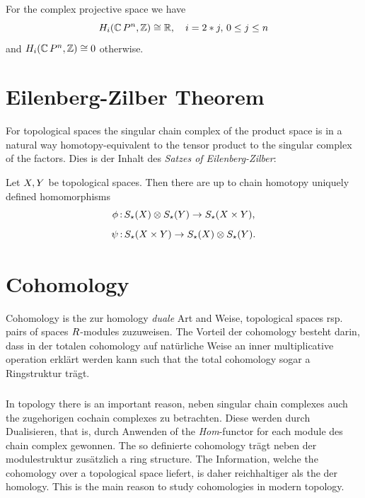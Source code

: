 \documentclass[11pt,twoside]{article}
\begin{document}
\subparagraph{}
For the complex projective space we have
\[
H_i({\mathbb{C}}\,P^n,{\mathbb{Z}}) \cong {\mathbb{R}}, \quad i=2*j, \, 0 \leq j \leq n
\]
and $H_i({\mathbb{C}}\,P^n,{\mathbb{Z}}) \cong 0$ otherwise.

\section{Eilenberg-Zilber Theorem}
For topological spaces the singular chain complex of the product space
is in a natural way homotopy-equivalent to the tensor product to the singular
complex of the factors.
Dies is der Inhalt des \textit{Satzes of Eilenberg-Zilber}:

\begin{theorem1}
Let $X,Y$ be topological spaces.
Then there are up to chain homotopy uniquely defined homomorphisms
\[
\phi{\,:\,} S_{\star}(X) \otimes S_{\star}(Y) \to S_{\star} (X \times Y),
\]
\[
\psi{\,:\,} S_{\star}(X \times Y) \to S_{\star}(X) \otimes S_{\star}(Y).
\]
\end{theorem1}

\section{Cohomology}
Cohomology is the zur homology \textit{duale} Art and Weise,
topological spaces rsp. pairs of spaces $R$-modules zuzuweisen.
The Vorteil der cohomology besteht darin,
dass in der totalen cohomology auf nat\"urliche Weise an inner
multiplicative operation erkl\"art werden kann
such that
the total cohomology sogar a Ringstruktur tr\"agt.

\subparagraph{}
In topology there is an important reason,
neben singular chain complexes auch the zugehorigen cochain complexes
zu betrachten.
Diese werden durch Dualisieren,
that is,
durch Anwenden of the \textit{Hom}-functor
for each module des chain complex gewonnen.
The so definierte cohomology tr\"agt neben der modulestruktur zus\"atzlich
a ring structure.
The Information, welche the cohomology over a topological space
liefert, is daher reichhaltiger als the der homology.
This is the main reason to study cohomologies in modern topology.
\end{document}

